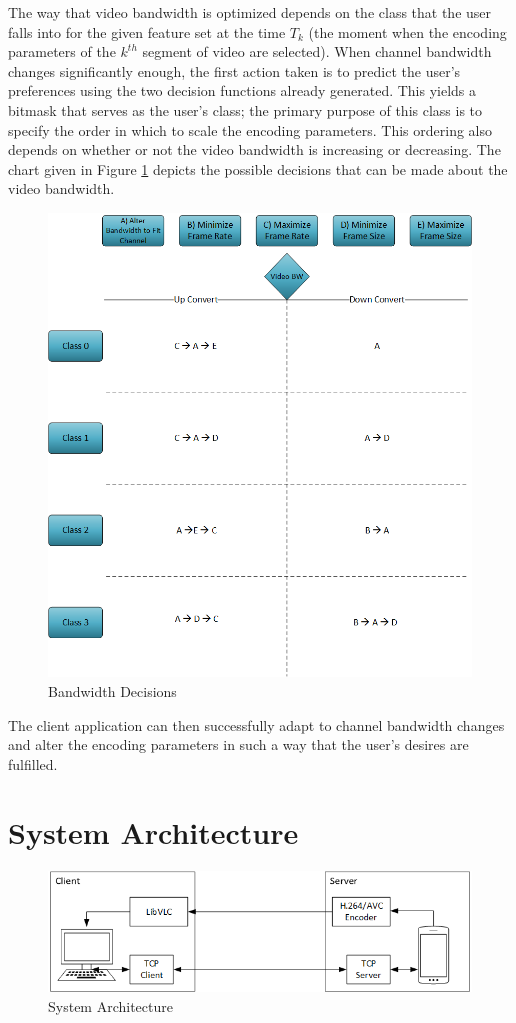 The way that video bandwidth is optimized depends on the class that the user falls into for the given feature set at the time $T_k$ (the moment when the encoding parameters of the $k^{th}$ segment of video are selected). When channel bandwidth changes significantly enough, the first action taken is to predict the user’s preferences using the two decision functions already generated. This yields a bitmask that serves as the user’s class; the primary purpose of this class is to specify the order in which to scale the encoding parameters. This ordering also depends on whether or not the video bandwidth is increasing or decreasing. The chart given in Figure \ref{fig:ScalingDecisionChart} depicts the possible decisions that can be made about the video bandwidth.
\begin{figure}[H]
\centering
\includegraphics[width=0.65\linewidth]{images/BandwidthDecisions.png}
\caption{Bandwidth Decisions}
\label{fig:ScalingDecisionChart}
\end{figure}
The client application can then successfully adapt to channel bandwidth changes and alter the encoding parameters in such a way that the user’s desires are fulfilled.
\section{System Architecture}
\label{sec:Architecture}
\begin{figure}[ht]
\centering
\includegraphics[width=0.7\linewidth]{images/SystemArchitecture.png}
\caption{System Architecture}
\label{fig:SystemArchitecture}
\end{figure}

